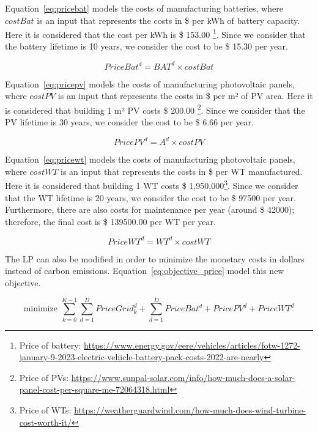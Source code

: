 Equation~\eqref{eq:pricebat} models the costs of manufacturing batteries, where $costBat$ is an input that represents the costs in \$ per kWh of battery capacity. Here it is considered that the cost per kWh is \$ 153.00 \footnote{Price of battery: \url{https://www.energy.gov/eere/vehicles/articles/fotw-1272-january-9-2023-electric-vehicle-battery-pack-costs-2022-are-nearly}}. Since we consider that the battery lifetime is 10 years, we consider the cost to be \$ 15.30 per year.


\begin{equation} \label{eq:pricebat}
   PriceBat^d = BAT^d \times costBat
\end{equation}

Equation~\eqref{eq:pricepv} models the costs of manufacturing photovoltaic panels, where $costPV$ is an input that represents the costs in \$ per m² of PV area. Here it is considered that building 1 m² PV costs \$ 200.00 \footnote{Price of PVs: \url{ https://www.sunpal-solar.com/info/how-much-does-a-solar-panel-cost-per-square-me-72064318.html}}. Since we consider that the PV lifetime is 30 years, we consider the cost to be \$ 6.66 per year. 


\begin{equation} \label{eq:pricepv}
   PricePV^d = A^d \times costPV
\end{equation}



Equation~\eqref{eq:pricewt} models the costs of manufacturing photovoltaic panels, where $costWT$ is an input that represents the costs in \$ per WT manufactured. Here it is considered that building 1 WT costs \$ 1,950,000\footnote{Price of WTs: \url{https://weatherguardwind.com/how-much-does-wind-turbine-cost-worth-it/}}. Since we consider that the WT lifetime is 20 years, we consider the cost to be \$ 97500 per year. Furthermore, there are also costs for maintenance per year (around \$ 42000); therefore, the final cost is \$ 139500.00 per WT per year.


\begin{equation} \label{eq:pricewt}
PriceWT^d = WT^d \times costWT
\end{equation}

The LP can also be modified in order to minimize the monetary costs in dollars instead of carbon emissions. Equation~\eqref{eq:objective_price} model this new objective.

\begin{equation} \label{eq:objective_price}
\text{minimize }\sum_{k=0}^{K-1} \sum_{d=1}^D PriceGrid^d_k  + \sum_{d=1}^D PriceBat^d + PricePV^d + PriceWT^d
\end{equation}

